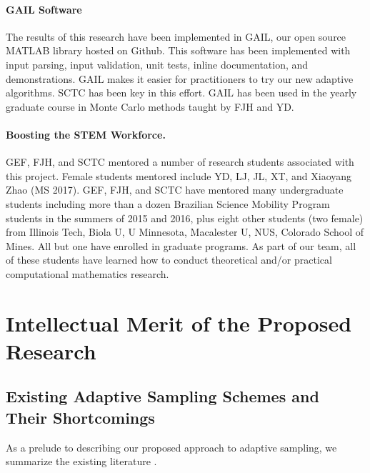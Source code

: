 \documentclass[11pt]{NSFamsart}
\newcommand{\GAIL}{GAIL\xspace}
\newcommand{\MATLAB}{MATLAB\xspace}
\newcommand{\Rlang}{R\xspace}
\begin{document}
\paragraph*{\GAIL Software} The results of this research have been implemented in 
\GAIL, our open source \MATLAB library hosted on
Github. This software 
has been implemented with input parsing, input validation, unit tests, inline documentation, and 
demonstrations.  \GAIL makes it easier for practitioners to try our new adaptive algorithms.  SCTC has been key in this effort.  \GAIL has been used in the yearly graduate course in Monte Carlo methods taught by FJH and YD.  

\paragraph*{Boosting the STEM Workforce.} GEF, FJH, and SCTC mentored a number of 
research students associated with this project.  Female students mentored include YD, LJ, JL, XT, and Xiaoyang Zhao (MS 2017).   GEF, FJH,  and SCTC have mentored many undergraduate students including more than a dozen 
Brazilian Science Mobility Program students in the summers of 2015 and 2016, plus eight other students (two female) from Illinois Tech, Biola U, U Minnesota, Macalester U, NUS, Colorado School of Mines.  All but one have enrolled in graduate programs.   As part of our team, all of
these students have learned how to conduct theoretical and/or practical computational mathematics research.

\section{Intellectual Merit of the Proposed Research} \label{sec:Proposed}

\subsection{Existing Adaptive Sampling Schemes and Their Shortcomings} \label{sec:shortExist}

As a prelude to describing our proposed approach to adaptive sampling, we summarize the existing literature \cite{aute2013cross,burnaev2015adaptive,fu2017adaptive,gramacy2008adaptive,jin2002sequential,kleijnen2004application}.
\end{document}
